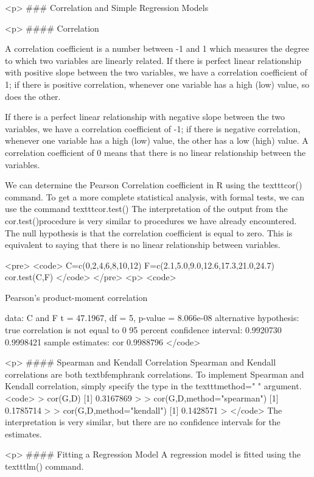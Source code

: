 



<p>
### {Correlation and Simple Regression Models}

<p>
#### {Correlation}

A correlation coefficient is a number between -1 and 1 which measures the degree to which two variables are linearly related. If there is perfect linear relationship with positive slope between the two variables, we have a correlation coefficient of 1; if there is positive correlation, whenever one variable has a high (low) value, so does the other.

If there is a perfect linear relationship with negative slope between the two variables, we have a correlation coefficient of -1; if there is negative correlation, whenever one variable has a high (low) value, the other has a low (high) value.
A correlation coefficient of 0 means that there is no linear relationship between the variables.

We can determine the Pearson Correlation coefficient in R using the texttt{cor()} command.
To get a more complete statistical analysis, with formal tests, we can use the command texttt{cor.test()}
The interpretation of the output from the cor.test()procedure is very similar to procedures we have already encountered. The null hypothesis is that the correlation coefficient is equal to zero. This is equivalent to saying that there is no linear relationship between variables.


<pre>
<code>
C=c(0,2,4,6,8,10,12) 
F=c(2.1,5.0,9.0,12.6,17.3,21.0,24.7)
cor.test(C,F)
</code>
</pre>
<p>
<code>

 Pearson's product-moment correlation

data:  C and F 
t = 47.1967, df = 5, p-value = 8.066e-08
alternative hypothesis: true correlation is not equal to 0 
95 percent confidence interval:
 0.9920730 0.9998421 
sample estimates:
      cor 
0.9988796 
</code>


<p>
#### {Spearman and Kendall Correlation}
Spearman and Kendall correlations are both textbf{emph{rank correlations}}. 
To implement Spearman and Kendall correlation, simply specify the type in the texttt{method=" "} argument.
<code>
> cor(G,D)
[1] 0.3167869
>
> cor(G,D,method="spearman")
[1] 0.1785714
>
> cor(G,D,method="kendall")
[1] 0.1428571
> 
</code>
The interpretation is very similar, but there are no confidence intervals for the estimates.

<p>
#### {Fitting a Regression Model}
A regression model is fitted using the texttt{lm()} command.

